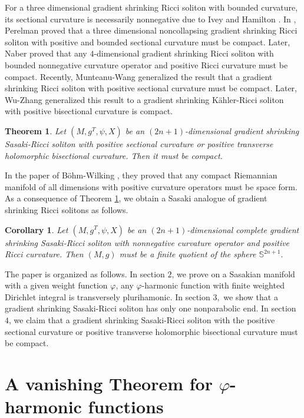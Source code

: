 \documentclass[12pt]{amsart}%
\newtheorem{theorem}{Theorem}
\newtheorem{corollary}{Corollary}
\numberwithin{equation}{section}
\begin{document}
For a three dimensional gradient shrinking Ricci soliton with bounded
curvature, its sectional curvature is necessarily nonnegative due to Ivey
\cite{i} and Hamilton \cite{h}. In \cite{p}, Perelman proved that a three
dimensional noncollapsing gradient shrinking Ricci soliton with positive and
bounded sectional curvature must be compact. Later, Naber \cite{n} proved that
any $4$-dimensional gradient shrinking Ricci soliton with bounded nonnegative
curvature operator and positive Ricci curvature must be compact. Recently,
Munteanu-Wang \cite{mw2} generalized the result that a gradient shrinking
Ricci soliton with positive sectional curvature must be compact. Later,
Wu-Zhang \cite{wz} generalized this result to a gradient shrinking
K\"{a}hler-Ricci soliton with positive bisectional curvature is compact.

\begin{theorem}
\label{T1}Let $(M,g^{T},\psi,X)$ be an $(2n+1)$-dimensional gradient shrinking
Sasaki-Ricci soliton with positive sectional curvature or positive transverse
holomorphic bisectional curvature. Then it must be compact.
\end{theorem}

In the paper of B\"{o}hm-Wilking \cite{bw}, they proved that any compact
Riemannian manifold of all dimensions with positive curvature operators must
be space form. As a consequence of Theorem \ref{T1}, we obtain a Sasaki
analogue of gradient shrinking Ricci solitons as follows.

\begin{corollary}
Let $(M,g^{T},\psi,X)$ be an $(2n+1)$-dimensional complete gradient shrinking
Sasaki-Ricci soliton with nonnegative curvature operator and positive Ricci
curvature. Then $(M,g)$ must be a finite quotient of the sphere $\mathbb{S}%
^{2n+1}.$
\end{corollary}

The paper is organized as follows. In section $2$, we prove on a Sasakian
manifold with a given weight function $\varphi$, any $\varphi$-harmonic
function with finite weighted Dirichlet integral is transversely plurihamonic.
In section $3,$ we show that a gradient shrinking Sasaki-Ricci soliton has
only one nonparabolic end. In section $4$, we claim that a gradient shrinking
Sasaki-Ricci soliton with the positive sectional curvature or positive
transverse holomorphic bisectional curvature must be compact.

\section{A vanishing Theorem for $\varphi$-harmonic functions}
\end{document}
